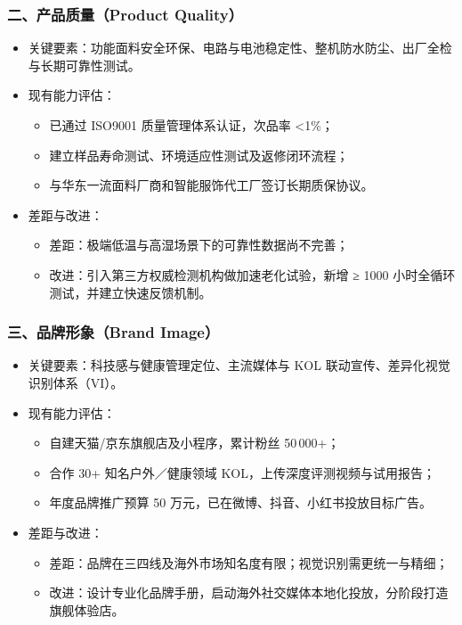 \documentclass[UTF8]{report}
\theoremstyle{MyLineTheoremStyle} %
\theoremstyle{MyBlockTheoremStyle} %
\theoremstyle{MySubsubsectionStyle} %
\begin{document}
  \subsubsection{二、产品质量（Product Quality）}
    \begin{itemize}
      \item 关键要素：功能面料安全环保、电路与电池稳定性、整机防水防尘、出厂全检与长期可靠性测试。  
      \item 现有能力评估：
        \begin{itemize}
          \item 已通过 ISO9001 质量管理体系认证，次品率 <1\%；  
          \item 建立样品寿命测试、环境适应性测试及返修闭环流程；  
          \item 与华东一流面料厂商和智能服饰代工厂签订长期质保协议。
        \end{itemize}
      \item 差距与改进：
        \begin{itemize}
          \item 差距：极端低温与高湿场景下的可靠性数据尚不完善；  
          \item 改进：引入第三方权威检测机构做加速老化试验，新增 ≥ 1000 小时全循环测试，并建立快速反馈机制。
        \end{itemize}
    \end{itemize}

  \subsubsection{三、品牌形象（Brand Image）}
    \begin{itemize}
      \item 关键要素：科技感与健康管理定位、主流媒体与 KOL 联动宣传、差异化视觉识别体系（VI）。  
      \item 现有能力评估：
        \begin{itemize}
          \item 自建天猫/京东旗舰店及小程序，累计粉丝 50\,000+；  
          \item 合作 30+ 知名户外／健康领域 KOL，上传深度评测视频与试用报告；  
          \item 年度品牌推广预算 50 万元，已在微博、抖音、小红书投放目标广告。
        \end{itemize}
      \item 差距与改进：
        \begin{itemize}
          \item 差距：品牌在三四线及海外市场知名度有限；视觉识别需更统一与精细；  
          \item 改进：设计专业化品牌手册，启动海外社交媒体本地化投放，分阶段打造旗舰体验店。
        \end{itemize}
    \end{itemize}
\end{document}
